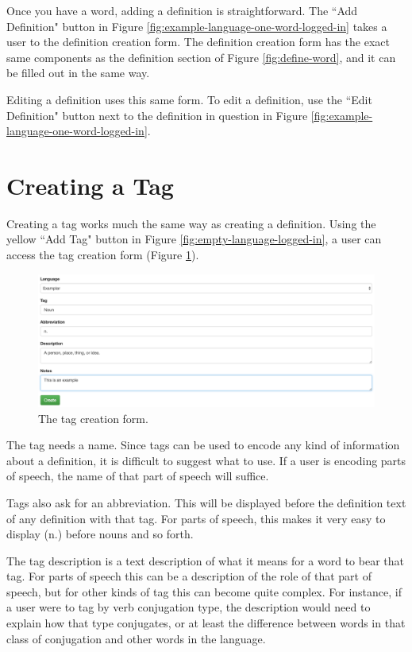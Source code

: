 Once you have a word, adding a definition is straightforward. The ``Add Definition" button in Figure \ref{fig:example-language-one-word-logged-in} takes a user to the definition creation form. The definition creation form has the exact same components as the definition section of Figure \ref{fig:define-word}, and it can be filled out in the same way.

Editing a definition uses this same form. To edit a definition, use the ``Edit Definition" button next to the definition in question in Figure \ref{fig:example-language-one-word-logged-in}.

\section{Creating a Tag}
\label{sec:create-tag}

Creating a tag works much the same way as creating a definition. Using the yellow ``Add Tag" button in Figure \ref{fig:empty-language-logged-in}, a user can access the tag creation form (Figure \ref{fig:create-tag}). 

\begin{figure}[h]
\includegraphics[width=\textwidth]{figures/create-tag}
\caption{The tag creation form.}
\centering
\label{fig:create-tag}
\end{figure}

The tag needs a name. Since tags can be used to encode any kind of information about a definition, it is difficult to suggest what to use. If a user is encoding parts of speech, the name of that part of speech will suffice. 

Tags also ask for an abbreviation. This will be displayed before the definition text of any definition with that tag. For parts of speech, this makes it very easy to display (n.) before nouns and so forth.

The tag description is a text description of what it means for a word to bear that tag. For parts of speech this can be a description of the role of that part of speech, but for other kinds of tag this can become quite complex. For instance, if a user were to tag by verb conjugation type, the description would need to explain how that type conjugates, or at least the difference between words in that class of conjugation and other words in the language.

